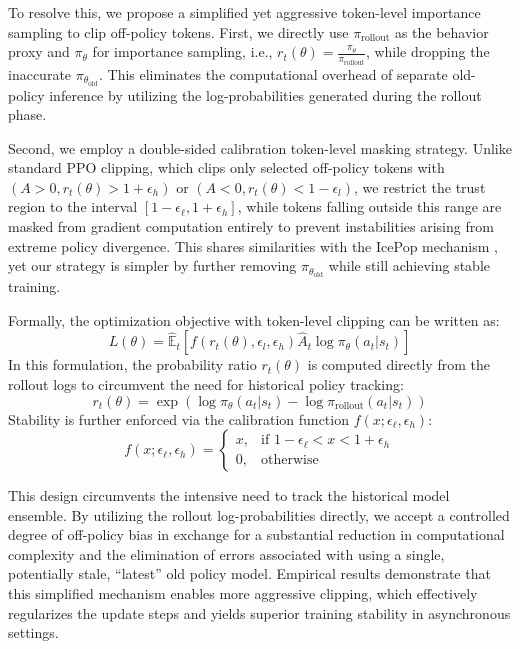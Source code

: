To resolve this, we propose a simplified yet aggressive token-level importance sampling to clip off-policy tokens.
First, we directly use $\pi_{\text{rollout}}$ as the behavior proxy and $\pi_{\theta}$ for importance sampling, i.e., $r_t(\theta)=\frac{\pi_{\theta}}{\pi_{\text{rollout}}}$, while dropping the inaccurate $\pi_{\theta_{\text{old}}}$. This eliminates the computational overhead of separate old-policy inference by utilizing the log-probabilities generated during the rollout phase.

Second, we employ a double-sided calibration token-level masking strategy. Unlike standard PPO clipping, which clips only selected off-policy tokens with $(A>0, r_t(\theta) > 1+\epsilon_h)$ or $(A<0, r_t(\theta)<1-\epsilon_l)$, we restrict the trust region to the interval $[1-\epsilon_\ell, 1+\epsilon_h]$, while tokens falling outside this range are masked from gradient computation entirely to prevent instabilities arising from extreme policy divergence. This shares similarities with the IcePop mechanism \cite{team2025every}, yet our strategy is simpler by further removing $\pi_{\theta_{\text{old}}}$ while still achieving stable training.

Formally, the optimization objective with token-level clipping can be written as:
\begin{equation}
    L(\theta) = \hat{\mathbb{E}}_t \left[ f(r_t(\theta), \epsilon_l, \epsilon_h) \hat{A}_t \log \pi_{\theta}(a_t|s_t) \right]
\end{equation}
In this formulation, the probability ratio $r_t(\theta)$ is computed directly from the rollout logs to circumvent the need for historical policy tracking:
\begin{equation}
    r_t(\theta) = \exp\left( \log \pi_\theta(a_t|s_t) - \log \pi_{\text{rollout}}(a_t|s_t) \right)
\end{equation}
Stability is further enforced via the calibration function $f(x; \epsilon_\ell, \epsilon_h)$:
\begin{equation}
    f(x; \epsilon_\ell, \epsilon_h) = 
    \begin{cases} 
    x, & \text{if } 1-\epsilon_\ell < x < 1+\epsilon_h \\
    0, & \text{otherwise}
    \end{cases}
\end{equation}


This design circumvents the intensive need to track the historical model ensemble. By utilizing the rollout log-probabilities directly, we accept a controlled degree of off-policy bias in exchange for a substantial reduction in computational complexity and the elimination of errors associated with using a single, potentially stale, ``latest'' old policy model. Empirical results demonstrate that this simplified mechanism enables more aggressive clipping, which effectively regularizes the update steps and yields superior training stability in asynchronous settings.




